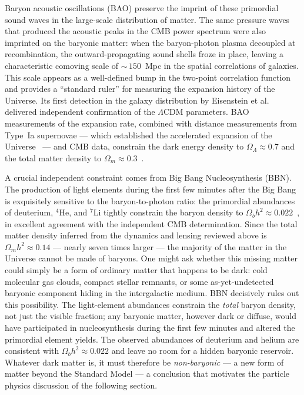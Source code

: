 Baryon acoustic oscillations (BAO) preserve the imprint of these primordial sound waves in the large-scale distribution of matter.
The same pressure waves that produced the acoustic peaks in the CMB power spectrum were also imprinted on the baryonic matter: when the baryon-photon plasma decoupled at recombination, the outward-propagating sound shells froze in place, leaving a characteristic comoving scale of ${\sim}\,150$~Mpc in the spatial correlations of galaxies.
This scale appears as a well-defined bump in the two-point correlation function and provides a ``standard ruler'' for measuring the expansion history of the Universe.
Its first detection in the galaxy distribution by Eisenstein et al.~\cite{SDSS:2005xqv} delivered independent confirmation of the $\Lambda$CDM parameters.
BAO measurements of the expansion rate, combined with distance measurements from Type~Ia supernovae --- which established the accelerated expansion of the Universe~\cite{SupernovaSearchTeam:1998fmf,SupernovaCosmologyProject:1998vns} --- and CMB data, constrain the dark energy density to $\Omega_\Lambda \approx 0.7$ and the total matter density to $\Omega_m \approx 0.3$~\cite{Aghanim:2018eyx,Pan-STARRS1:2017jku}.

A crucial independent constraint comes from Big Bang Nucleosynthesis (BBN).
The production of light elements during the first few minutes after the Big Bang is exquisitely sensitive to the baryon-to-photon ratio: the primordial abundances of deuterium, $^4$He, and $^7$Li tightly constrain the baryon density to $\Omega_b h^2 \approx 0.022$~\cite{Iocco:2008va,ParticleDataGroup:2022pth}, in excellent agreement with the independent CMB determination.
Since the total matter density inferred from the dynamics and lensing reviewed above is $\Omega_m h^2 \approx 0.14$ --- nearly seven times larger --- the majority of the matter in the Universe cannot be made of baryons.
One might ask whether this missing matter could simply be a form of ordinary matter that happens to be dark: cold molecular gas clouds, compact stellar remnants, or some as-yet-undetected baryonic component hiding in the intergalactic medium.
BBN decisively rules out this possibility.
The light-element abundances constrain the \emph{total} baryon density, not just the visible fraction; any baryonic matter, however dark or diffuse, would have participated in nucleosynthesis during the first few minutes and altered the primordial element yields.
The observed abundances of deuterium and helium are consistent with $\Omega_b h^2 \approx 0.022$ and leave no room for a hidden baryonic reservoir.
Whatever dark matter is, it must therefore be \emph{non-baryonic} --- a new form of matter beyond the Standard Model --- a conclusion that motivates the particle physics discussion of the following section.
